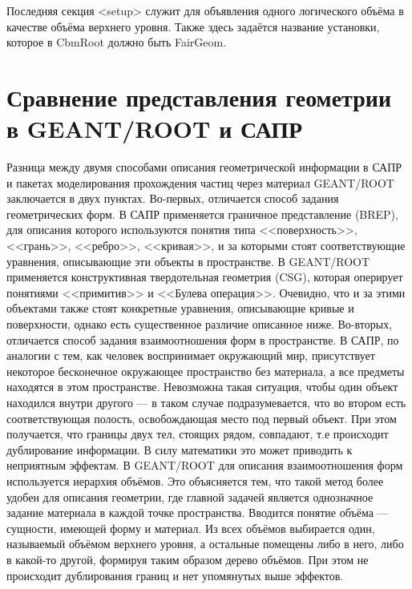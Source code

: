 Последняя секция <setup> служит для объявления одного логического объёма в качестве объёма верхнего уровня. Также здесь задаётся название установки, которое в CbmRoot должно быть FairGeom.

%                                                       

\section{Сравнение представления геометрии в GEANT/ROOT и САПР}\label{sec:secROOTvsCAD}

Разница между двумя способами описания геометрической информации в САПР и пакетах моделирования прохождения частиц через материал GEANT/ROOT заключается в двух пунктах. Во-первых, отличается способ задания геометрических форм. В САПР применяется граничное представление (BREP), для описания которого используются понятия типа <<поверхность>>, <<грань>>, <<ребро>>, <<кривая>>, и за которыми стоят соответствующие уравнения, описывающие эти объекты в пространстве. В GEANT/ROOT применяется конструктивная твердотельная геометрия (CSG), которая оперирует понятиями <<примитив>> и <<Булева операция>>. Очевидно, что и за этими объектами также стоят конкретные уравнения, описывающие кривые и поверхности, однако есть существенное различие описанное ниже. Во-вторых, отличается способ задания взаимоотношения форм в пространстве. В САПР, по аналогии с тем, как человек воспринимает окружающий мир, присутствует некоторое бесконечное окружающее пространство без материала, а все предметы находятся в этом пространстве. Невозможна такая ситуация, чтобы один объект находился внутри другого --- в таком случае подразумевается, что во втором есть соответствующая полость, освобождающая место под первый объект. При этом получается, что границы двух тел, стоящих рядом, совпадают, т.е происходит дублирование информации.
\todo В силу математики это может приводить к неприятным эффектам. \todo
В GEANT/ROOT для описания взаимоотношения форм используется иерархия объёмов. Это объясняется тем, что такой метод более удобен для описания геометрии, где главной задачей является однозначное задание материала в каждой точке пространства. Вводится понятие объёма --- сущности, имеющей форму и материал. Из всех объёмов выбирается один, называемый объёмом верхнего уровня, а остальные помещены либо в него, либо в какой-то другой, формируя таким образом дерево объёмов.
\todo При этом не происходит дублирования границ и нет упомянутых выше эффектов. \todo

